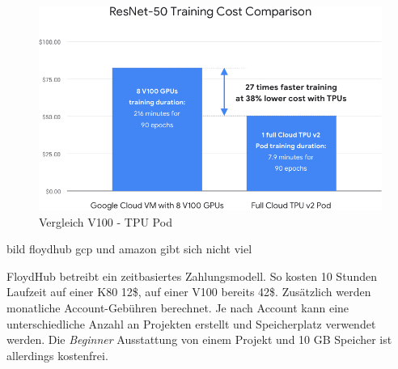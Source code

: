 \begin{figure}[ht]
	\begin{center}
		\includegraphics[width=14cm]{Bilder/tpu_comparison.png} 
		\caption[Vergleich V100 - TPU Pod]{Vergleich V100 - TPU Pod \cite{GoogleCloud.20200209b}}
		\label{tpu}
	\end{center}
\end{figure}

bild floydhub
gcp und amazon gibt sich nicht viel

FloydHub betreibt ein zeitbasiertes Zahlungsmodell. So kosten 10 Stunden Laufzeit auf einer K80 12\$, auf einer V100 bereits 42\$. Zusätzlich werden monatliche Account-Gebühren berechnet. Je nach Account kann eine unterschiedliche Anzahl an Projekten erstellt und Speicherplatz verwendet werden. Die \textit{Beginner} Ausstattung von einem Projekt und 10 GB Speicher ist allerdings kostenfrei. 